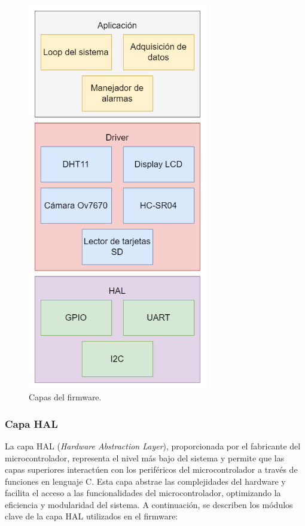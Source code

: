 \vspace{1cm}

\begin{figure}[htbp]
	\centering
	\includegraphics[width=0.7\textwidth, height=0.5\textheight]{./Figures/firmware_general.png}
	\caption{Capas del firmware.}
	\label{fig:firmware_general}
\end{figure}

\vspace{1cm}

\subsubsection{Capa HAL}

La capa HAL (\textit{Hardware Abstraction Layer}), proporcionada por el fabricante del microcontrolador, representa el nivel más bajo del sistema y permite que las capas superiores interactúen con los periféricos del microcontrolador a través de funciones en lenguaje C. Esta capa abstrae las complejidades del hardware y facilita el acceso a las funcionalidades del microcontrolador, optimizando la eficiencia y modularidad del sistema. A continuación, se describen los módulos clave de la capa HAL utilizados en el firmware:

